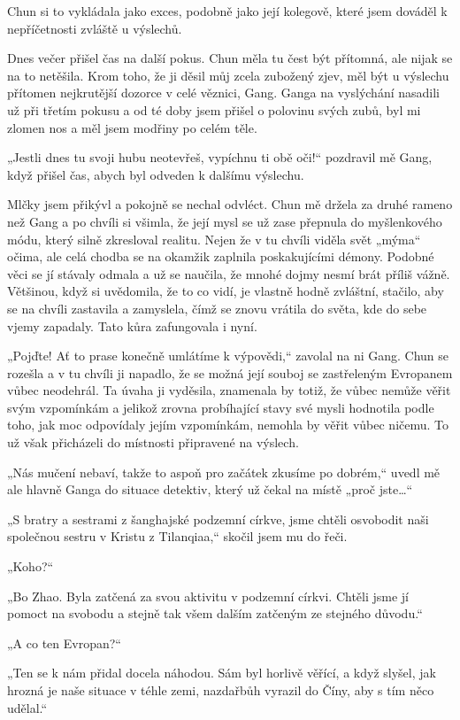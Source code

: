 Chun si to vykládala jako exces, podobně jako její kolegově, které jsem dováděl k nepříčetnosti zvláště u výslechů.

Dnes večer přišel čas na další pokus. Chun měla tu čest být přítomná, ale nijak se na to netěšila. Krom toho, že ji děsil můj zcela zubožený zjev, měl být u výslechu přítomen nejkrutější dozorce v celé věznici, Gang. Ganga na vyslýchání nasadili už při třetím pokusu a od té doby jsem přišel o polovinu svých zubů, byl mi zlomen nos a měl jsem modřiny po celém těle.

„Jestli dnes tu svoji hubu neotevřeš, vypíchnu ti obě oči!“ pozdravil mě Gang, když přišel čas, abych byl odveden k dalšímu výslechu.

Mlčky jsem přikývl a pokojně se nechal odvléct. Chun mě držela za druhé rameno než Gang a po chvíli si všimla, že její mysl se už zase přepnula do myšlenkového módu, který silně zkresloval realitu. Nejen že v tu chvíli viděla svět „mýma“ očima, ale celá chodba se na okamžik zaplnila poskakujícími démony. Podobné věci se jí stávaly odmala a už se naučila, že mnohé dojmy nesmí brát příliš vážně. Většinou, když si uvědomila, že to co vidí, je vlastně hodně zvláštní, stačilo, aby se na chvíli zastavila a zamyslela, čímž se znovu vrátila do světa, kde do sebe vjemy zapadaly. Tato kůra zafungovala i nyní. 

„Pojďte! Ať to prase konečně umlátíme k výpovědi,“ zavolal na ni Gang. Chun se rozešla a v tu chvíli ji napadlo, že se možná její souboj se zastřeleným Evropanem vůbec neodehrál. Ta úvaha ji vyděsila, znamenala by totiž, že vůbec nemůže věřit svým vzpomínkám a jelikož zrovna probíhající stavy své mysli hodnotila podle toho, jak moc odpovídaly jejím vzpomínkám, nemohla by věřit vůbec ničemu. To už však přicházeli do místnosti připravené na výslech.

„Nás mučení nebaví, takže to aspoň pro začátek zkusíme po dobrém,“ uvedl mě ale hlavně Ganga do situace detektiv, který už čekal na místě „proč jste…“

„S bratry a sestrami z šanghajské podzemní církve, jsme chtěli osvobodit naši společnou sestru v Kristu z Tilanqiaa,“ skočil jsem mu do řeči.

„Koho?“

„Bo Zhao. Byla zatčená za svou aktivitu v podzemní církvi. Chtěli jsme jí pomoct na svobodu a stejně tak všem dalším zatčeným ze stejného důvodu.“

„A co ten Evropan?“

„Ten se k nám přidal docela náhodou. Sám byl horlivě věřící, a když slyšel, jak hrozná je naše situace v téhle zemi, nazdařbůh vyrazil do Číny, aby s tím něco udělal.“

